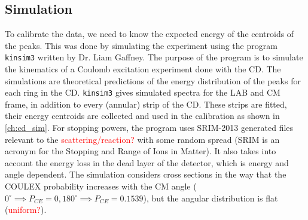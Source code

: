\documentclass[twoside,english]{uiofysmaster/uiofysmaster}
\let\orgautoref\autoref
\renewcommand{\autoref}
        {%
		 \def\subsectionautorefname{Section}%
		 \def\subsubsectionautorefname{Section}%
          \orgautoref}
\begin{document}


\subsection{Simulation}




To calibrate the data, we need to know the expected energy of the centroids of the peaks. 
This was done by simulating the experiment using the program \texttt{kinsim3} \cite{kinsim} written by Dr. Liam Gaffney. 
The purpose of the program is to simulate the kinematics of a Coulomb excitation experiment done with the CD. 
The simulations are theoretical predictions of the energy distribution of the peaks for each ring in the CD. 
\texttt{kinsim3} gives simulated spectra for the LAB and CM frame, in addition to every (annular) strip of the CD.
These strips are fitted, their energy centroids are collected and used in the calibration as shown in \autoref{ch:cd_sim}.
For stopping powers, the program uses SRIM-2013 \cite{SRIM} generated files relevant to the \textcolor{red}{scattering/reaction?} with some random spread (SRIM is an acronym for the Stopping and Range of Ions in Matter).
It also takes into account the energy loss in the dead layer of the detector, which is energy and angle dependent. 
The simulation considers cross sections in the way that the COULEX probability increases with the CM angle ($0^\circ \implies P_{CE} = 0, 180^\circ \implies P_{CE} = 0.1539$), but the angular distribution is flat (\textcolor{red}{uniform?}). 
\end{document}
